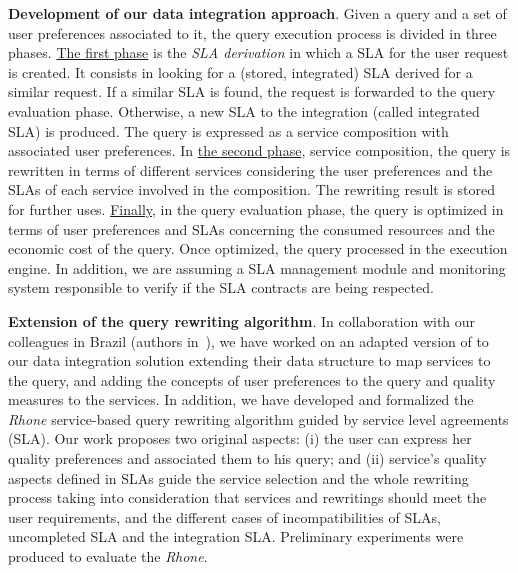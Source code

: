 \documentclass[11pt,a4paper,oneside]{report}
\begin{document}
\noindent \textbf{Development of our data integration approach}. Given a query and a set of user preferences associated to it, the query execution process is divided in three phases. 
\underline{The first phase} is the \textsl{SLA derivation} in which a SLA for the user request is created. It consists in looking for a (stored, integrated) SLA derived for a similar request. If a similar SLA is found, the request is forwarded to the query evaluation phase. Otherwise, a new SLA to the integration (called integrated SLA) is produced. The query is expressed as a service composition with associated user preferences. In \underline{the second phase}, service composition, the query is rewritten in terms of different services considering the user preferences and the SLAs of each service involved in the composition. The rewriting result is stored for further uses. \underline{Finally}, in the query evaluation phase, the query is optimized in terms of user preferences and SLAs concerning the consumed resources and the economic cost of the query. Once optimized, the query processed in the execution engine. In addition, we are assuming a SLA management module and monitoring system responsible to verify if the SLA contracts are being respected. %

\noindent \textbf{Extension of the query rewriting algorithm}. In collaboration with our colleagues in Brazil (authors in~\cite{ba2014}), we have worked on an adapted version of \cite{ba2014} to our data integration solution extending their data structure to map services to the query, and adding the concepts of user preferences to the query and quality measures to the services. In addition, we have developed and formalized the \textit{Rhone} service-based query rewriting algorithm guided by service level agreements (SLA). Our work proposes two original aspects: (i) the user can express her quality preferences and associated them to his query; and (ii) service's quality aspects defined in SLAs guide the service selection and the whole rewriting process taking into consideration that services and rewritings should meet the user requirements, and the different cases of incompatibilities of SLAs, uncompleted SLA and the integration SLA. Preliminary experiments were produced to evaluate the \textsl{Rhone}.
\end{document}
